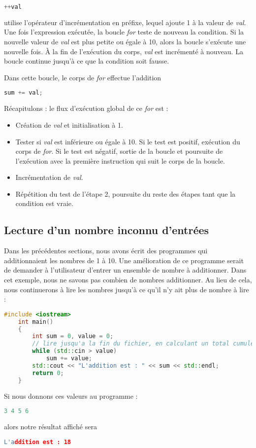 \medbreak
\begin{lstlisting}[language=C++]
	++val
\end{lstlisting}
\medbreak

utilise l'opérateur d'incrémentation en préfixe, lequel ajoute 1 à la valeur de \textit{val}. Une fois l'expression exécutée, la boucle \textit{for} teste de nouveau la condition. Si la nouvelle valeur de \textit{val} est plus petite ou égale à 10, alors la boucle s'exécute une nouvelle fois. À la fin de l'exécution du corps, \textit{val} est incrémenté à nouveau. La boucle continue jusqu'à ce que la condition soit fausse.

Dans cette boucle, le corps de \textit{for} effectue l'addition

\medbreak
\begin{lstlisting}[language=C++]
	sum += val; 
\end{lstlisting}
\bigbreak

Récapitulons : le flux d'exécution global de ce \textit{for} est :

\medbreak
\begin{itemize}
	\item[\textbullet] Création de \textit{val} et initialisation à 1.
	\item[\textbullet] Tester si \textit{val} est inférieure ou égale à 10. Si le test est positif, exécution du corps de \textit{for}. Si le test est négatif, sortie de la boucle et poursuite de l'exécution avec la première instruction qui suit le corps de la boucle.
	\item[\textbullet] Incrémentation de \textit{val}.
	\item[\textbullet] Répétition du test de l'étape 2, poursuite du reste des étapes tant que la condition est vraie.
\end{itemize}
\medbreak

\subsection{Lecture d'un nombre inconnu d'entrées}
Dans les précédentes sections, nous avons écrit des programmes qui additionnaient les nombres de 1 à 10. Une amélioration de ce programme serait de demander à l'utilisateur d'entrer un ensemble de nombre à additionner. Dans cet exemple, nous ne savons pas combien de nombres additionner. Au lieu de cela, nous continuerons à lire les nombres jusqu'à ce qu'il n'y ait plus de nombre à lire :

\medbreak
\begin{lstlisting}[language=C++]
	#include <iostream>
	int main()
	{
		int sum = 0, value = 0;
		// lire jusqu'a la fin du fichier, en calculant un total cumule de toutes les valeurs lues
		while (std::cin > value)
			sum += value;
		std::cout << "L'addition est : " << sum << std::endl;
		return 0;
	}
\end{lstlisting}
\bigbreak

Si nous donnons ces valeurs au programme :

\medbreak
\begin{lstlisting}[language=C++]
	3 4 5 6
\end{lstlisting}
\bigbreak

alors notre résultat affiché sera 

\medbreak
\begin{lstlisting}[language=C++]
	L'addition est : 18 
\end{lstlisting}
\bigbreak

